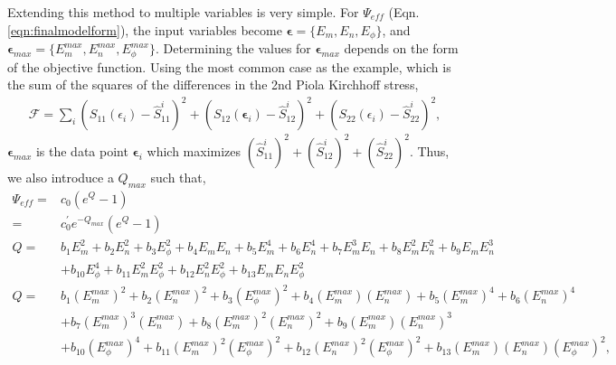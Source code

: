 	Extending this method to multiple variables is very simple. For $\Psi_{eff}$ (Eqn. \ref{eqn:finalmodelform}), the input variables become $\mathbf{\epsilon} = \{E_m, E_n, E_\phi\}$, and $\mathbf{\epsilon}_{max} = \{E_m^{max},E_n^{max},E_\phi^{max}\}$. Determining the values for $\mathbf{\epsilon}_{max}$ depends on the form of the objective function. Using the most common case as the example, which is the sum of the squares of the differences in the 2nd Piola Kirchhoff stress,
\begin{equation}
\begin{aligned}
\mathcal{F} = \sum_i \left(S_{11}(\epsilon_i) - \hat{S}_{11}^i\right)^2 + \left(S_{12}(\mathbf{\epsilon}_i) - \hat{S}_{12}^i\right)^2 + \left(S_{22}(\epsilon_i) - \hat{S}_{22}^i\right)^2,
\end{aligned}
\end{equation}
$\mathbf{\epsilon}_{max}$ is the data point $\mathbf{\epsilon}_i$ which maximizes $\left(\hat{S}_{11}^i\right)^2 + \left(\hat{S}_{12}^i\right)^2 + \left(\hat{S}_{22}^i\right)^2$. 
Thus, we also introduce a $Q_{max}$ such that,
\begin{equation} \label{eqn:finalexponentialmodelformscaled}
\begin{aligned}
\Psi_{eff} 	=& c_0 \left(e^{Q} - 1\right) \\
            =& c_0^\prime e^{-Q_{max}}\left(e^{Q} - 1\right)    \\
Q		=& b_1 E_m^2 + b_2 E_n^2 + b_3 E_\phi^2 + b_4 E_m E_n + b_5 E_m^4 + b_6 E_n^4 + b_7 E_m^3 E_n + b_8 E_m^2 E_n^2 + b_9 E_m E_n^3	\\
	&+ b_{10} E_\phi^4 + b_{11} E_m^2E_\phi^2 + b_{12} E_n^2 E_\phi^2 + b_{13} E_m E_n E_\phi^2 \\
Q		=& b_1 (E_m^{max})^2 + b_2 (E_n^{max})^2 + b_3 (E_\phi^{max})^2 + b_4 (E_m^{max}) (E_n^{max}) + b_5 (E_m^{max})^4 + b_6 (E_n^{max})^4   \\ 
    &+ b_7 (E_m^{max})^3 (E_n^{max}) + b_8 (E_m^{max})^2 (E_n^{max})^2 + b_9 (E_m^{max}) (E_n^{max})^3	\\
	&+ b_{10} (E_\phi^{max})^4 + b_{11} (E_m^{max})^2(E_\phi^{max})^2 + b_{12} (E_n^{max})^2 (E_\phi^{max})^2 + b_{13} (E_m^{max}) (E_n^{max}) (E_\phi^{max})^2,
\end{aligned}
\end{equation}
